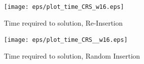 \documentclass{llncs}
\begin{document}
\begin{figure}[!t]
\centering
\texttt{[image: eps/plot\_time\_CRS\_w16.eps]}
\caption{Time required to solution, Re-Insertion}
\label{fig:plot_time_ri_w16}
\end{figure}

\begin{figure}[!t]
\centering
\texttt{[image: eps/plot\_time\_CRS\_\_w16.eps]}
\caption{Time required to solution, Random Insertion}
\label{fig:plot_time_ra_w16}
\end{figure}



%

\begin{footnotesize}

\end{footnotesize}
\end{document}
